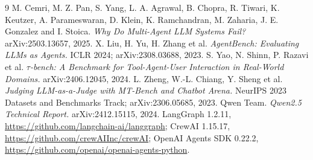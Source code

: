 \documentclass[10pt,twocolumn]{article}
\begin{document}
\begin{thebibliography}{9}
\small
{} M. Cemri, M. Z. Pan, S. Yang, L. A. Agrawal, B. Chopra, R. Tiwari,
  K. Keutzer, A. Parameswaran, D. Klein, K. Ramchandran, M. Zaharia,
  J. E. Gonzalez and I. Stoica. \emph{Why Do Multi-Agent LLM Systems Fail?}
  arXiv:2503.13657, 2025.
 X. Liu, H. Yu, H. Zhang et al. \emph{AgentBench: Evaluating
  LLMs as Agents.} ICLR 2024; arXiv:2308.03688, 2023.
 S. Yao, N. Shinn, P. Razavi et al. \emph{$\tau$-bench: A
  Benchmark for Tool-Agent-User Interaction in Real-World Domains.}
  arXiv:2406.12045, 2024.
 L. Zheng, W.-L. Chiang, Y. Sheng et al. \emph{Judging
  LLM-as-a-Judge with MT-Bench and Chatbot Arena.} NeurIPS 2023 Datasets and
  Benchmarks Track; arXiv:2306.05685, 2023.
 Qwen Team. \emph{Qwen2.5 Technical Report.} arXiv:2412.15115, 2024.
 LangGraph 1.2.11, \url{https://github.com/langchain-ai/langgraph};
  CrewAI 1.15.17, \url{https://github.com/crewAIInc/crewAI}; OpenAI Agents SDK
  0.22.2, \url{https://github.com/openai/openai-agents-python}.
\end{thebibliography}
\end{document}
